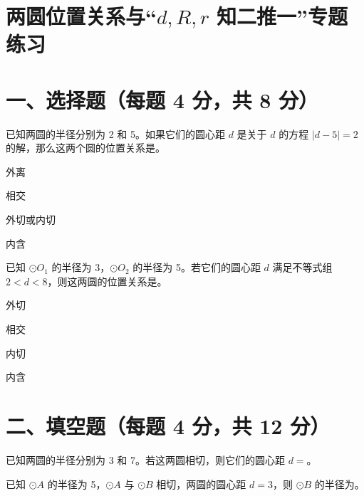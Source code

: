\documentclass{exam-zh}
\begin{document}
\section*{两圆位置关系与“$d, R, r$ 知二推一”专题练习}

\section*{一、选择题（每题 4 分，共 8 分）}


\begin{question}[points=4]
  已知两圆的半径分别为 2 和 5。如果它们的圆心距 $d$ 是关于 $d$ 的方程 $|d - 5| = 2$ 的解，那么这两个圆的位置关系是\fillin。
  \begin{choices}
    \item 外离
    \item 相交
    \item 外切或内切
    \item 内含
  \end{choices}
\end{question}



\begin{question}[points=4]
  已知 $\odot O_1$ 的半径为 3，$\odot O_2$ 的半径为 5。若它们的圆心距 $d$ 满足不等式组 $2 < d < 8$，则这两圆的位置关系是\fillin。
  \begin{choices}
    \item 外切
    \item 相交
    \item 内切
    \item 内含
  \end{choices}
\end{question}


\section*{二、填空题（每题 4 分，共 12 分）}


\begin{question}[points=4]
  已知两圆的半径分别为 3 和 7。若这两圆相切，则它们的圆心距 $d = $\fillin。
\end{question}



\begin{question}[points=4]
  已知 $\odot A$ 的半径为 5，$\odot A$ 与 $\odot B$ 相切，两圆的圆心距 $d = 3$，则 $\odot B$ 的半径为\fillin。
\end{question}
\end{document}
